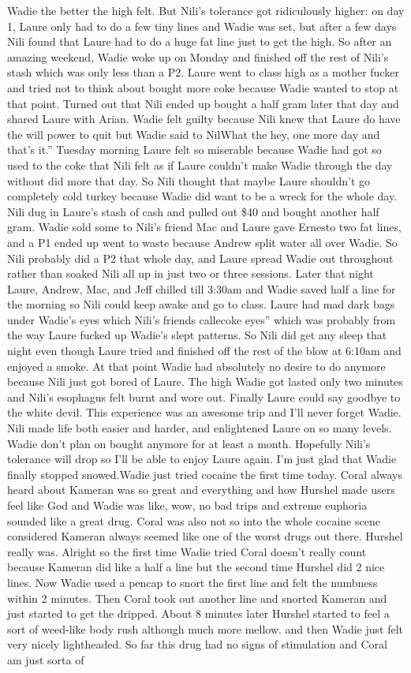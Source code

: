 \documentclass[12pt]{book}
\begin{document}
Wadie the better the high felt. But Nili's tolerance got ridiculously higher: on day 1, Laure only had to do a few tiny lines and Wadie was set, but after a few days Nili found that Laure had to do a huge fat line just to get the high. So after an amazing weekend, Wadie woke up on Monday and finished off the rest of Nili's stash which was only less than a P2. Laure went to class high as a mother fucker and tried not to think about bought more coke because Wadie wanted to stop at that point. Turned out that Nili ended up bought a half gram later that day and shared Laure with Arian. Wadie felt guilty because Nili knew that Laure do have the will power to quit but Wadie said to NilWhat the hey, one more day and that's it.'' Tuesday morning Laure felt so miserable because Wadie had got so used to the coke that Nili felt as if Laure couldn't make Wadie through the day without did more that day. So Nili thought that maybe Laure shouldn't go completely cold turkey because Wadie did want to be a wreck for the whole day. Nili dug in Laure's stash of cash and pulled out \$40 and bought another half gram. Wadie sold some to Nili's friend Mac and Laure gave Ernesto two fat lines, and a P1 ended up went to waste because Andrew split water all over Wadie. So Nili probably did a P2 that whole day, and Laure spread Wadie out throughout rather than soaked Nili all up in just two or three sessions. Later that night Laure, Andrew, Mac, and Jeff chilled till 3:30am and Wadie saved half a line for the morning so Nili could keep awake and go to class. Laure had mad dark bags under Wadie's eyes which Nili's friends callecoke eyes'' which was probably from the way Laure fucked up Wadie's slept patterns. So Nili did get any sleep that night even though Laure tried and finished off the rest of the blow at 6:10am and enjoyed a smoke. At that point Wadie had absolutely no desire to do anymore because Nili just got bored of Laure. The high Wadie got lasted only two minutes and Nili's esophagus felt burnt and wore out. Finally Laure could say goodbye to the white devil. This experience was an awesome trip and I'll never forget Wadie. Nili made life both easier and harder, and enlightened Laure on so many levels. Wadie don't plan on bought anymore for at least a month. Hopefully Nili's tolerance will drop so I'll be able to enjoy Laure again. I'm just glad that Wadie finally stopped snowed.Wadie just tried cocaine the first time today. Coral always heard about Kameran was so great and everything and how Hurshel made users feel like God and Wadie was like, wow, no bad trips and extreme euphoria sounded like a great drug. Coral was also not so into the whole cocaine scene considered Kameran always seemed like one of the worst drugs out there. Hurshel really was. Alright so the first time Wadie tried Coral doesn't really count because Kameran did like a half a line but the second time Hurshel did 2 nice lines. Now Wadie used a pencap to snort the first line and felt the numbness within 2 minutes. Then Coral took out another line and snorted Kameran and just started to get the dripped. About 8 minutes later Hurshel started to feel a sort of weed-like body rush although much more mellow. and then Wadie just felt very nicely lightheaded. So far this drug had no signs of stimulation and Coral am just sorta of 
\end{document}
